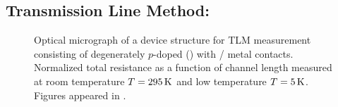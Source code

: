 \subsection{Transmission Line Method: \degenerate}\label{subsec:TLM_degenerate}
\begin{figure}[ht]
	\centering
	\caption[TLM: contact resistances using \degenerate]{\protect{} Optical micrograph of a device structure for \acs{TLM} measurement consisting of degenerately $p$-doped  (\degenerate) with / metal contacts. \protect{} Normalized total resistance as a function of channel length measured at room temperature $T=295\,\mathrm{K}$ and \protect{} low temperature $T=5\,\mathrm{K}$. Figures appeared in \cite{Chuang_2016}.}
	\label{fig:tlm_resistance_measurement_degenerate}
\end{figure}

